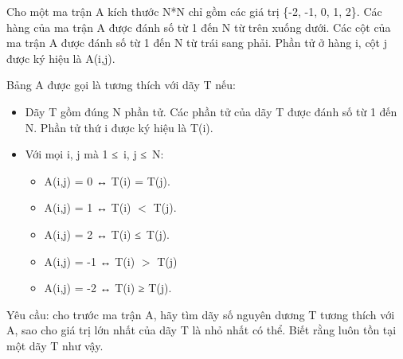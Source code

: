 Cho một ma trận A kích thước N*N chỉ gồm các giá trị \{-2, -1, 0, 1, 2\}. Các hàng của ma trận A được đánh số từ 1 đến N từ trên xuống dưới. Các cột của ma trận A được đánh số từ 1 đến N từ trái sang phải. Phần tử ở hàng i, cột j được ký hiệu là A(i,j).

Bảng A được gọi là tương thích với dãy T nếu:
\begin{itemize}
	\item Dãy T gồm đúng N phần tử. Các phần tử của dãy T được đánh số từ 1 đến N. Phần tử thứ i được ký hiệu là T(i).
	\item Với mọi i, j mà 1 ≤ i, j ≤ N:
\begin{itemize}
	\item A(i,j) = 0 ↔ T(i) = T(j).
	\item A(i,j) = 1 ↔ T(i) $<$ T(j).
	\item A(i,j) = 2 ↔ T(i) ≤ T(j).
	\item A(i,j) = -1 ↔ T(i) $>$ T(j)
	\item A(i,j) = -2 ↔ T(i) ≥ T(j).
\end{itemize}
\end{itemize}

Yêu cầu: cho trước ma trận A, hãy tìm dãy số nguyên dương T tương thích với A, sao cho giá trị lớn nhất của dãy T là nhỏ nhất có thể. Biết rằng luôn tồn tại một dãy T như vậy.
